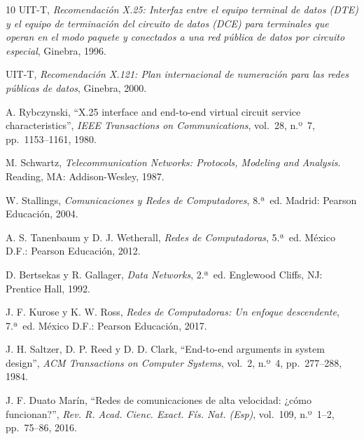 \documentclass[12pt,a4paper]{article}
\begin{document}
\begin{thebibliography}{10}
    UIT-T, \textit{Recomendación X.25: Interfaz entre el equipo terminal de datos (DTE) y el equipo de terminación del circuito de datos (DCE) para terminales que operan en el modo paquete y conectados a una red pública de datos por circuito especial}, Ginebra, 1996.

    UIT-T, \textit{Recomendación X.121: Plan internacional de numeración para las redes públicas de datos}, Ginebra, 2000.

    A. Rybczynski, ``X.25 interface and end-to-end virtual circuit service characteristics'', \textit{IEEE Transactions on Communications}, vol.~28, n.º~7, pp.~1153--1161, 1980.

    M. Schwartz, \textit{Telecommunication Networks: Protocols, Modeling and Analysis}. Reading, MA: Addison-Wesley, 1987.

    W. Stallings, \textit{Comunicaciones y Redes de Computadores}, 8.ª~ed. Madrid: Pearson Educación, 2004.

    A. S. Tanenbaum y D. J. Wetherall, \textit{Redes de Computadoras}, 5.ª~ed. México D.F.: Pearson Educación, 2012.

    D. Bertsekas y R. Gallager, \textit{Data Networks}, 2.ª~ed. Englewood Cliffs, NJ: Prentice Hall, 1992.

    J. F. Kurose y K. W. Ross, \textit{Redes de Computadoras: Un enfoque descendente}, 7.ª~ed. México D.F.: Pearson Educación, 2017.

    J. H. Saltzer, D. P. Reed y D. D. Clark, ``End-to-end arguments in system design'', \textit{ACM Transactions on Computer Systems}, vol.~2, n.º~4, pp.~277--288, 1984.

    J. F. Duato Marín, ``Redes de comunicaciones de alta velocidad: ¿cómo funcionan?'', \textit{Rev. R. Acad. Cienc. Exact. Fís. Nat. (Esp)}, vol.~109, n.º~1--2, pp.~75--86, 2016.
\end{thebibliography}
\end{document}

